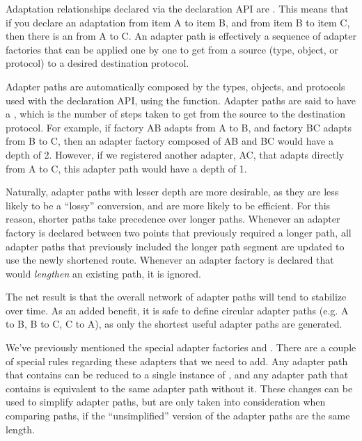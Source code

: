 \begin{verbatim%
}
\begin{verbatim%
}
\begin{verbatim%
}
\begin{verbatim%
}
\begin{verbatim%
}
\begin{verbatim%
}
Adaptation relationships declared via the declaration API are
.  This means that if you declare an adaptation from item A
to item B, and from item B to item C, then there is an 
from A to C.  An adapter path is effectively a sequence of adapter factories
that can be applied one by one to get from a source (type, object, or protocol)
to a desired destination protocol.

Adapter paths are automatically composed by the types, objects, and protocols
used with the declaration API, using the  function.
Adapter paths are said to have a , which is the number of steps
taken to get from the source to the destination protocol.  For example, if
factory AB adapts from A to B, and factory BC adapts from B to C, then an
adapter factory composed of AB and BC would have a depth of 2.  However, if we
registered another adapter, AC, that adapts directly from A to C, this adapter
path would have a depth of 1.

Naturally, adapter paths with lesser depth are more desirable, as they are less
likely to be a ``lossy'' conversion, and are more likely to be efficient.  For
this reason, shorter paths take precedence over longer paths.  Whenever an
adapter factory is declared between two points that previously required a
longer path, all adapter paths that previously included the longer path segment
are updated to use the newly shortened route.  Whenever an adapter factory is
declared that would \emph{lengthen} an existing path, it is ignored.

The net result is that the overall network of adapter paths will tend to
stabilize over time.  As an added benefit, it is safe to define circular
adapter paths (e.g. A to B, B to C, C to A), as only the shortest useful
adapter paths are generated.



We've previously mentioned the special adapter factories
 and .  There are a
couple of special rules regarding these adapters that we need to add.  Any
adapter path that contains  can be reduced to a
single instance of , and any adapter path that
contains  is equivalent to the same adapter path
without it. These changes can be used to simplify adapter paths, but are only
taken into consideration when comparing paths, if the ``unsimplified'' version
of the adapter paths are the same length.


\end{verbatim%
}
\end{verbatim%
}
\end{verbatim%
}
\end{verbatim%
}
\end{verbatim%
}
\end{verbatim%
}
